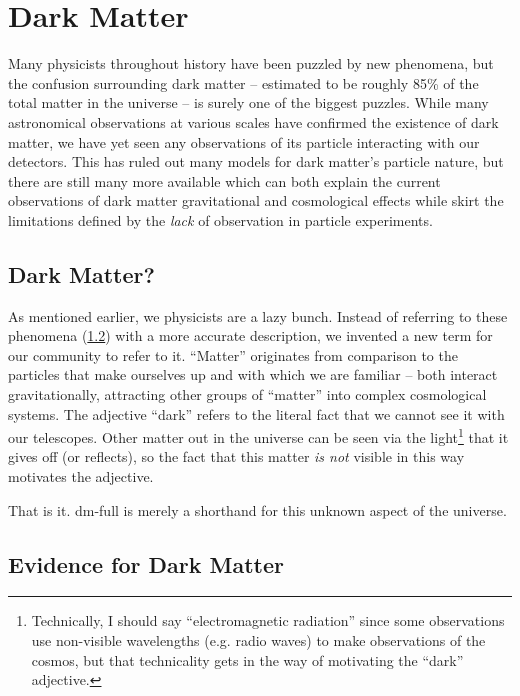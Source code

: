 \chapter{Dark Matter}
\label{chapter:dm}

Many physicists throughout history have been puzzled by new phenomena, but the
confusion surrounding dark matter -- estimated to be roughly 85\% of the total
matter in the universe -- is surely one of the biggest puzzles. While many
astronomical observations at various scales have confirmed the existence of
dark matter, we have yet seen any observations of its particle interacting
with our detectors. This has ruled out many models for dark matter's particle
nature, but there are still many more available which can both explain the
current observations of dark matter gravitational and cosmological effects
while skirt the limitations defined by the \emph{lack} of observation in
particle experiments.

\section{Dark Matter?}
As mentioned earlier, we physicists are a lazy bunch.
Instead of referring to these phenomena (\cref{sec:dm:evidence}) with a more accurate description,
we invented a new term for our community to refer to it.
``Matter'' originates from comparison to the particles that make ourselves up and with which
we are familiar -- both interact gravitationally, attracting other groups of ``matter'' into
complex cosmological systems.
The adjective ``dark'' refers to the literal fact that we cannot see it with our telescopes.
Other matter out in the universe can be seen via the light\footnote{
    Technically, I should say ``electromagnetic radiation'' since some observations use
    non-visible wavelengths (e.g. radio waves) to make observations of the cosmos, but that
    technicality gets in the way of motivating the ``dark'' adjective.
} that it gives off (or reflects),
so the fact that this matter \emph{is not} visible in this way motivates the adjective.

That is it. \gls{dm-full} is merely a shorthand for this unknown aspect of the universe.

\section{Evidence for Dark Matter}
\label{sec:dm:evidence}

